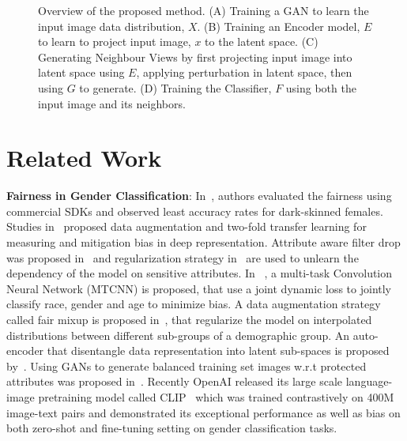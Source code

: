 \documentclass[runningheads]{llncs}
\begin{document}
\begin{figure*}[!hbtp]
{}
\clearpage{}
\caption{Overview of the proposed method. (A) Training a GAN to learn the input image data distribution, $X$. (B) Training an Encoder model, $E$ to learn to project input image, $x$ to the latent space. (C) Generating Neighbour Views by first projecting input image into latent space using $E$, applying perturbation in latent space, then using $G$ to generate. (D) Training the Classifier, $F$ using both the input image and its neighbors.} 
    \label{fig:nsl_teaser}
\end{figure*}


\section{Related Work}

\noindent\textbf{Fairness in Gender Classification}:
In~\cite{gender_shades}, authors evaluated the fairness using commercial SDKs and observed least accuracy rates for dark-skinned females. Studies in~\cite{gender_age_transfer,Ryu18} proposed data augmentation and two-fold transfer learning for measuring and mitigation bias in deep representation. Attribute aware filter drop was proposed in~\cite{att_aware_filter} and regularization strategy in~\cite{tartaglione} are used to unlearn the dependency of the model on sensitive attributes. 
In ~\cite{multitask}, a multi-task Convolution Neural Network (MTCNN) is proposed, that use a joint dynamic loss to jointly classify race, gender and age to minimize bias. A data augmentation strategy called fair mixup is proposed in~\cite{fair_mixup}, that regularize the model on interpolated distributions between different sub-groups of a demographic group. An auto-encoder that disentangle data representation into latent sub-spaces is proposed by~\cite{readme}. 
Using GANs to generate balanced training set images w.r.t protected attributes was proposed in~\cite{gan_debias}. Recently OpenAI released its large scale language-image pretraining model called CLIP~\cite{clip} which was trained contrastively on 400M image-text pairs and demonstrated its exceptional performance as well as bias on both zero-shot and fine-tuning setting on gender classification tasks.\\
\end{document}
